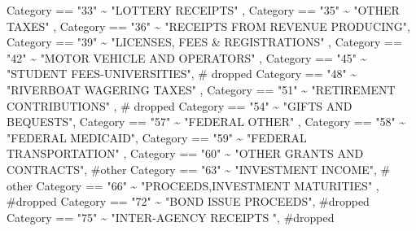 \documentclass[
  letterpaper,
  DIV=11,
  numbers=noendperiod]{scrreport}
\newenvironment{Shaded}{\begin{snugshade}}{\end{snugshade}}
\newcommand{\CommentTok}[1]{\textcolor[rgb]{0.37,0.37,0.37}{#1}}
\newcommand{\NormalTok}[1]{\textcolor[rgb]{0.00,0.23,0.31}{#1}}
\newcommand{\SpecialCharTok}[1]{\textcolor[rgb]{0.37,0.37,0.37}{#1}}
\newcommand{\StringTok}[1]{\textcolor[rgb]{0.13,0.47,0.30}{#1}}
\begin{document}
\begin{Shaded}
\begin{Highlighting}[]
\NormalTok{    Category }\SpecialCharTok{==} \StringTok{"33"} \SpecialCharTok{\textasciitilde{}}  \StringTok{"LOTTERY RECEIPTS"}\NormalTok{ ,}
\NormalTok{    Category }\SpecialCharTok{==} \StringTok{"35"} \SpecialCharTok{\textasciitilde{}}  \StringTok{"OTHER TAXES"}\NormalTok{ ,}
\NormalTok{    Category }\SpecialCharTok{==} \StringTok{"36"} \SpecialCharTok{\textasciitilde{}}  \StringTok{"RECEIPTS FROM REVENUE PRODUCING"}\NormalTok{, }
\NormalTok{    Category }\SpecialCharTok{==} \StringTok{"39"} \SpecialCharTok{\textasciitilde{}}  \StringTok{"LICENSES, FEES \& REGISTRATIONS"}\NormalTok{ ,}
\NormalTok{    Category }\SpecialCharTok{==} \StringTok{"42"} \SpecialCharTok{\textasciitilde{}}  \StringTok{"MOTOR VEHICLE AND OPERATORS"}\NormalTok{ ,}
\NormalTok{    Category }\SpecialCharTok{==} \StringTok{"45"} \SpecialCharTok{\textasciitilde{}}  \StringTok{"STUDENT FEES{-}UNIVERSITIES"}\NormalTok{,   }\CommentTok{\# dropped}
\NormalTok{    Category }\SpecialCharTok{==} \StringTok{"48"} \SpecialCharTok{\textasciitilde{}}  \StringTok{"RIVERBOAT WAGERING TAXES"}\NormalTok{ ,}
\NormalTok{    Category }\SpecialCharTok{==} \StringTok{"51"} \SpecialCharTok{\textasciitilde{}}  \StringTok{"RETIREMENT CONTRIBUTIONS"}\NormalTok{ , }\CommentTok{\# dropped}
\NormalTok{    Category }\SpecialCharTok{==} \StringTok{"54"} \SpecialCharTok{\textasciitilde{}} \StringTok{"GIFTS AND BEQUESTS"}\NormalTok{, }
\NormalTok{    Category }\SpecialCharTok{==} \StringTok{"57"} \SpecialCharTok{\textasciitilde{}}  \StringTok{"FEDERAL OTHER"}\NormalTok{ ,}
\NormalTok{    Category }\SpecialCharTok{==} \StringTok{"58"} \SpecialCharTok{\textasciitilde{}}  \StringTok{"FEDERAL MEDICAID"}\NormalTok{, }
\NormalTok{    Category }\SpecialCharTok{==} \StringTok{"59"} \SpecialCharTok{\textasciitilde{}}  \StringTok{"FEDERAL TRANSPORTATION"}\NormalTok{ ,}
\NormalTok{    Category }\SpecialCharTok{==} \StringTok{"60"} \SpecialCharTok{\textasciitilde{}}  \StringTok{"OTHER GRANTS AND CONTRACTS"}\NormalTok{, }\CommentTok{\#other}
\NormalTok{    Category }\SpecialCharTok{==} \StringTok{"63"} \SpecialCharTok{\textasciitilde{}}  \StringTok{"INVESTMENT INCOME"}\NormalTok{, }\CommentTok{\# other}
\NormalTok{    Category }\SpecialCharTok{==} \StringTok{"66"} \SpecialCharTok{\textasciitilde{}} \StringTok{"PROCEEDS,INVESTMENT MATURITIES"}\NormalTok{ , }\CommentTok{\#dropped}
\NormalTok{    Category }\SpecialCharTok{==} \StringTok{"72"} \SpecialCharTok{\textasciitilde{}} \StringTok{"BOND ISSUE PROCEEDS"}\NormalTok{,  }\CommentTok{\#dropped}
\NormalTok{    Category }\SpecialCharTok{==} \StringTok{"75"} \SpecialCharTok{\textasciitilde{}}  \StringTok{"INTER{-}AGENCY RECEIPTS "}\NormalTok{,  }\CommentTok{\#dropped}

\end{Highlighting}
\end{Shaded}
\end{document}
